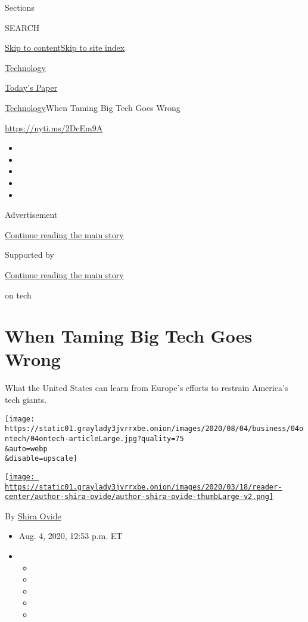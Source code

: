 Sections

SEARCH

\protect\hyperlink{site-content}{Skip to
content}\protect\hyperlink{site-index}{Skip to site index}

\href{https://www.nytimes3xbfgragh.onion/section/technology}{Technology}

\href{https://myaccount.nytimes3xbfgragh.onion/auth/login?response_type=cookie\&client_id=vi}{}

\href{https://www.nytimes3xbfgragh.onion/section/todayspaper}{Today's
Paper}

\href{/section/technology}{Technology}\textbar{}When Taming Big Tech
Goes Wrong

\url{https://nyti.ms/2DcEm9A}

\begin{itemize}
\item
\item
\item
\item
\item
\end{itemize}

Advertisement

\protect\hyperlink{after-top}{Continue reading the main story}

Supported by

\protect\hyperlink{after-sponsor}{Continue reading the main story}

on tech

\hypertarget{when-taming-big-tech-goes-wrong}{%
\section{When Taming Big Tech Goes
Wrong}\label{when-taming-big-tech-goes-wrong}}

What the United States can learn from Europe's efforts to restrain
America's tech giants.

\texttt{[image: https://static01.graylady3jvrrxbe.onion/images/2020/08/04/business/04ontech/04ontech-articleLarge.jpg?quality=75\\\&auto=webp\\\&disable=upscale]}

\href{https://www.nytimes3xbfgragh.onion/by/shira-ovide}{\texttt{[image: https://static01.graylady3jvrrxbe.onion/images/2020/03/18/reader-center/author-shira-ovide/author-shira-ovide-thumbLarge-v2.png]}}

By \href{https://www.nytimes3xbfgragh.onion/by/shira-ovide}{Shira Ovide}

\begin{itemize}
\item
  Aug. 4, 2020, 12:53 p.m. ET
\item
  \begin{itemize}
  \item
  \item
  \item
  \item
  \item
  \end{itemize}
\end{itemize}

